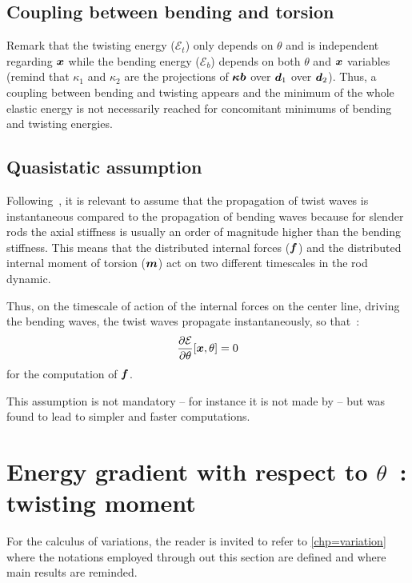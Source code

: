 \subsection{Coupling between bending and torsion}
Remark that the twisting energy ($\mathcal{E}_{t}$) only depends on $\theta$ and is independent regarding $\boldsymbol{x}$ while the bending energy ($\mathcal{E}_{b}$) depends on both $\theta$ and $\boldsymbol{x}$ variables (remind that $\kappa_1$ and $\kappa_2$ are the projections of $\boldsymbol{\kappa b}$ over $\boldsymbol{d}_1$ over $\boldsymbol{d}_2$). Thus, a coupling between bending and twisting appears and the minimum of the whole elastic energy is not necessarily reached for concomitant minimums of bending and twisting energies.

\subsection{Quasistatic assumption}
Following~, it is relevant to assume that the propagation of twist waves is instantaneous compared to the propagation of bending waves because for slender rods the axial stiffness is usually an order of magnitude higher than the bending stiffness. This means that the distributed internal forces ($\boldsymbol{f}$) and the  distributed internal moment of torsion ($\boldsymbol{m}$) act on two different timescales in the rod dynamic.

Thus, on the timescale of action of the internal forces on the center line, driving the bending waves, the twist waves propagate instantaneously, so that~:
\begin{equation}
	\frac{\partial \mathcal{E}}{\partial\theta}[\boldsymbol{x}, \theta]=0
\label{eq:quasistat_hyp}
\end{equation}
for the computation of $\boldsymbol{f}$.

This assumption is not mandatory -- for instance it is not made by  -- but was found to lead to simpler and faster computations.

\section{Energy gradient with respect to $\theta$~: twisting moment}\label{sec=dE_dtheta}

For the calculus of variations, the reader is invited to refer to \cref{chp=variation} where the notations employed through out this section are defined and where main results are reminded.


